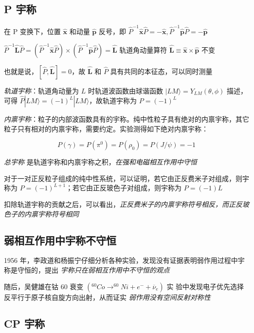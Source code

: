 \subsection{P 宇称}

在 P 变换下，位置 $\hat{\mathbf{x}}$ 和动量 $\hat{\mathbf{p}}$ 反号，即 $\hat{P}^{-1} \hat{\mathbf{x}} \hat{P} = -\hat{\mathbf{x}}, \hat{P}^{-1} \hat{\mathbf{p}} \hat{P} = -\hat{\mathbf{p}}$

$\hat{P}^{-1} \hat{\mathbf{L}} \hat{P} = (\hat{P}^{-1} \hat{\mathbf{x}} \hat{P}) \times (\hat{P}^{-1} \hat{\mathbf{p}} \hat{P}) = \hat{\mathbf{L}}$ 轨道角动量算符 $\hat{\mathbf{L}} \equiv \hat{\mathbf{x}} \times \hat{\mathbf{p}}$ 不变

也就是说，$[\hat{P}, \hat{\mathbf{L}}] = 0$，故 $\hat{\mathbf{L}}$ 和 $\hat{P}$ 具有共同的本征态，可以同时测量

\emph{轨道宇称}：轨道角动量为 $L$ 时轨道波函数由球谐函数 $|LM\rangle = Y_{LM} (\theta, \phi)$ 描述，可得 $\hat{P} |LM\rangle = (-1)^L |LM\rangle$，故轨道宇称为 $P = (-1)^L$

\emph{内禀宇称}：粒子的内部波函数具有的宇称。纯中性粒子具有绝对的内禀宇称，其它粒子只有相对的内禀宇称，需要约定。实验测得如下绝对内禀宇称：

\begin{equation}
    P(\gamma) = P(\pi^0) = P(\rho_0) = P(J/\psi) = -1
\end{equation}

\emph{总宇称} 是轨道宇称和内禀宇称之积，\emph{在强和电磁相互作用中守恒}

对于一对正反粒子组成的纯中性系统，可以证明，若它由正反费米子对组成，则宇称为 $P = (-1)^{L+1}$；若它由正反玻色子对组成，则宇称为 $P = (-1)L$

扣除轨道宇称的贡献之后，可以看出，\emph{正反费米子的内禀宇称符号相反，而正反玻色子的内禀宇称符号相同}

\subsection{弱相互作用中宇称不守恒}

1956 年，李政道和杨振宁仔细分析各种实验，发现没有证据表明弱作用过程中宇称是守恒的，提出 \emph{宇称只在弱相互作用中不守恒的观点}

随后，吴健雄在钴 60 衰变 $(^{60}Co \to ^{60}Ni + e^- + \overline{\nu}_e)$ 实 验中发现电子优先选择反平行于原子核自旋方向出射，从而证实 \emph{弱作用没有空间反射对称性}

\subsection{CP 宇称}

